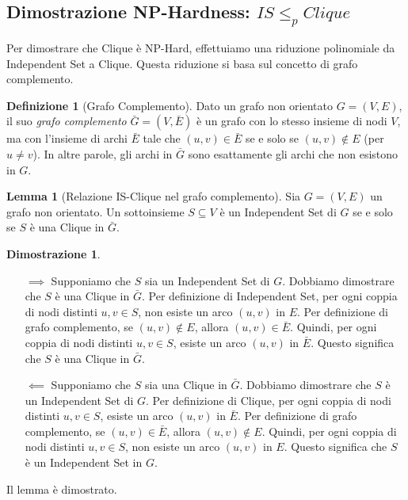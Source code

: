 \documentclass[a4paper]{article}
\theoremstyle{definition} %
\newtheorem{definition}{Definizione}[section]
\newtheorem{lemma}{Lemma}[section]
\theoremstyle{definition} %
\newtheorem*{proof*}{Dimostrazione}
\begin{document}
\subsection{Dimostrazione NP-Hardness: $IS \le_p Clique$}

Per dimostrare che Clique è NP-Hard, effettuiamo una riduzione polinomiale da Independent Set a Clique. Questa riduzione si basa sul concetto di grafo complemento.

\begin{definition}[Grafo Complemento]
Dato un grafo non orientato $G=(V, E)$, il suo \emph{grafo complemento} $\bar{G}=(V, \bar{E})$ è un grafo con lo stesso insieme di nodi $V$, ma con l'insieme di archi $\bar{E}$ tale che $(u, v) \in \bar{E}$ se e solo se $(u, v) \notin E$ (per $u \ne v$). In altre parole, gli archi in $\bar{G}$ sono esattamente gli archi che non esistono in $G$.
\end{definition}

\begin{lemma}[Relazione IS-Clique nel grafo complemento]
Sia $G=(V, E)$ un grafo non orientato. Un sottoinsieme $S \subseteq V$ è un Independent Set di $G$ se e solo se $S$ è una Clique in $\bar{G}$.
\end{lemma}

\begin{proof*}
\begin{itemize}
    \item[$\implies$] Supponiamo che $S$ sia un Independent Set di $G$.
    Dobbiamo dimostrare che $S$ è una Clique in $\bar{G}$.
    Per definizione di Independent Set, per ogni coppia di nodi distinti $u, v \in S$, non esiste un arco $(u, v)$ in $E$.
    Per definizione di grafo complemento, se $(u, v) \notin E$, allora $(u, v) \in \bar{E}$.
    Quindi, per ogni coppia di nodi distinti $u, v \in S$, esiste un arco $(u, v)$ in $\bar{E}$. Questo significa che $S$ è una Clique in $\bar{G}$.

    \item[$\impliedby$] Supponiamo che $S$ sia una Clique in $\bar{G}$.
    Dobbiamo dimostrare che $S$ è un Independent Set di $G$.
    Per definizione di Clique, per ogni coppia di nodi distinti $u, v \in S$, esiste un arco $(u, v)$ in $\bar{E}$.
    Per definizione di grafo complemento, se $(u, v) \in \bar{E}$, allora $(u, v) \notin E$.
    Quindi, per ogni coppia di nodi distinti $u, v \in S$, non esiste un arco $(u, v)$ in $E$. Questo significa che $S$ è un Independent Set in $G$.
\end{itemize}
Il lemma è dimostrato.
\end{proof*}
\end{document}
